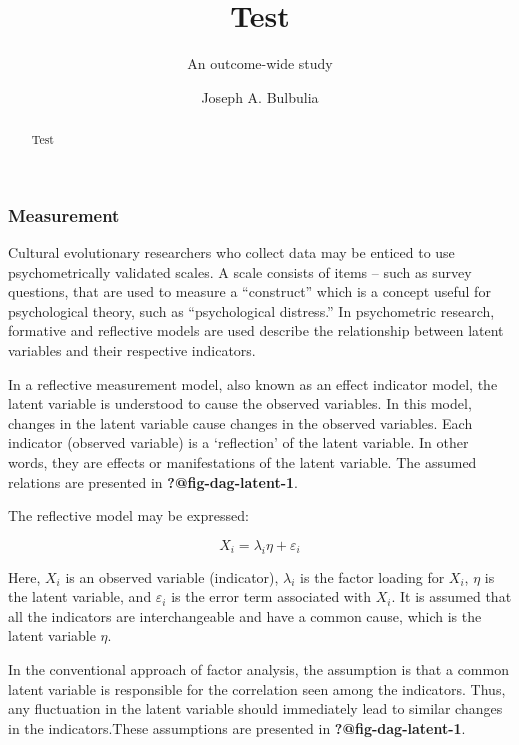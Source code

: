 \documentclass[
  letterpaper,
  DIV=11,
  numbers=noendperiod]{scrartcl}
\title{Test}
\subtitle{An outcome-wide study}
\author{Joseph A. Bulbulia}
\date{}
\renewcommand*\contentsname{Table of contents}
\newcommand\contentsname{Table of contents}
\begin{document}
\maketitle
\begin{abstract}
Test
\end{abstract}
\ifdefined\Shaded\renewenvironment{Shaded}{\begin{tcolorbox}[enhanced, interior hidden, frame hidden, sharp corners, boxrule=0pt, borderline west={3pt}{0pt}{shadecolor}, breakable]}{\end{tcolorbox}}\fi

\renewcommand*\contentsname{Table of contents}
{
\hypersetup{linkcolor=}
\setcounter{tocdepth}{3}
\tableofcontents
}
\hypertarget{measurement}{%
\subsubsection{Measurement}\label{measurement}}

Cultural evolutionary researchers who collect data may be enticed to use
psychometrically validated scales. A scale consists of items -- such as
survey questions, that are used to measure a ``construct'' which is a
concept useful for psychological theory, such as ``psychological
distress.'' In psychometric research, formative and reflective models
are used describe the relationship between latent variables and their
respective indicators.

In a reflective measurement model, also known as an effect indicator
model, the latent variable is understood to cause the observed
variables. In this model, changes in the latent variable cause changes
in the observed variables. Each indicator (observed variable) is a
`reflection' of the latent variable. In other words, they are effects or
manifestations of the latent variable. The assumed relations are
presented in \textbf{?@fig-dag-latent-1}.

The reflective model may be expressed:

\[X_i = \lambda_i \eta + \varepsilon_i\]

Here, \(X_i\) is an observed variable (indicator), \(\lambda_i\) is the
factor loading for \(X_i\), \(\eta\) is the latent variable, and
\(\varepsilon_i\) is the error term associated with \(X_i\). It is
assumed that all the indicators are interchangeable and have a common
cause, which is the latent variable \(\eta\).

In the conventional approach of factor analysis, the assumption is that
a common latent variable is responsible for the correlation seen among
the indicators. Thus, any fluctuation in the latent variable should
immediately lead to similar changes in the indicators.These assumptions
are presented in \textbf{?@fig-dag-latent-1}.
\end{document}

